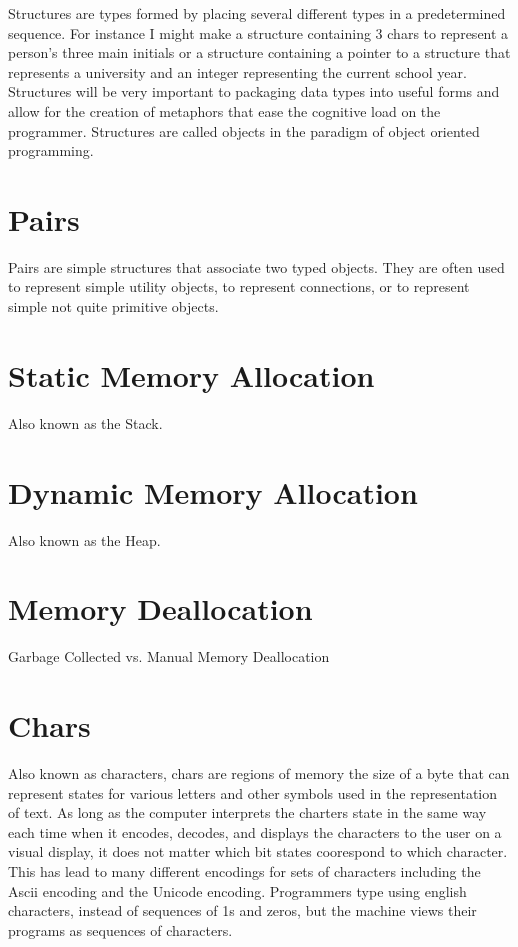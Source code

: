 \documentclass[12pt, letterpaper]{book}
\begin{document}
	Structures are types formed by placing several different types in a predetermined sequence. For instance I might make a structure containing 3 chars to represent a person's three main initials or a structure containing a pointer to a structure that represents a university and an integer representing the current school year. Structures will be very important to packaging data types into useful forms and allow for the creation of metaphors that ease the cognitive load on the programmer. Structures are called objects in the paradigm of object oriented programming.

	\section{Pairs}

Pairs are simple structures that associate two typed objects. They are often used to represent simple utility objects, to represent connections, or to represent simple not quite primitive objects.

	\section{Static Memory Allocation} \label{static memory}

Also known as the Stack.

	\section{Dynamic Memory Allocation} \label{dynamic memory}

Also known as the Heap.
	\section[Memory Deallocation]{Memory Deallocation}

Garbage Collected vs. Manual Memory Deallocation

	\section{Chars}

	Also known as characters, chars are regions of memory the size of a byte that can represent states for various letters and other symbols used in the representation of text. As long as the computer interprets the charters state in the same way each time when it encodes, decodes, and displays the characters to the user on a visual display, it does not matter which bit states coorespond to which character. This has lead to many different encodings for sets of characters including the Ascii encoding and the Unicode encoding. Programmers type using english characters, instead of sequences of 1s and zeros, but the machine views their programs as sequences of characters.
\end{document}
